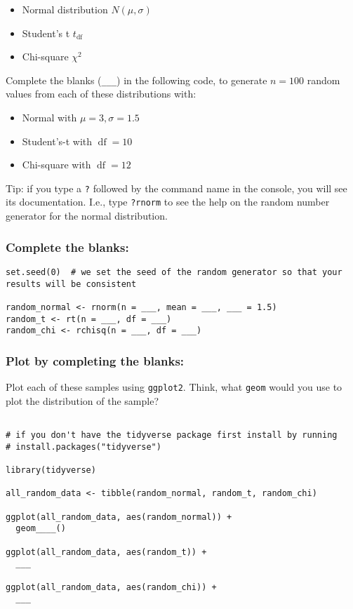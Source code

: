 \documentclass[
]{article}
\providecommand{\tightlist}{%
  \setlength{\itemsep}{0pt}\setlength{\parskip}{0pt}}
\begin{document}
\begin{itemize}
\tightlist
\item
  Normal distribution \(N(\mu, \sigma)\)
\item
  Student's t \(t_{\operatorname{df}}\)
\item
  Chi-square \(\chi^2\)
\end{itemize}

Complete the blanks (\texttt{\_\_\_}) in the following code, to generate
\(n=100\) random values from each of these distributions with:

\begin{itemize}
\tightlist
\item
  Normal with \(\mu=3, \sigma = 1.5\)
\item
  Student's-t with \(\operatorname{df}=10\)
\item
  Chi-square with \(\operatorname{df}=12\)
\end{itemize}

Tip: if you type a \texttt{?} followed by the command name in the
console, you will see its documentation. I.e., type \texttt{?rnorm} to
see the help on the random number generator for the normal distribution.

\hypertarget{complete-the-blanks}{%
\subsubsection{Complete the blanks:}\label{complete-the-blanks}}

\begin{verbatim}
set.seed(0)  # we set the seed of the random generator so that your results will be consistent

random_normal <- rnorm(n = ___, mean = ___, ___ = 1.5)
random_t <- rt(n = ___, df = ___)
random_chi <- rchisq(n = ___, df = ___)
\end{verbatim}

\hypertarget{plot-by-completing-the-blanks}{%
\subsubsection{Plot by completing the
blanks:}\label{plot-by-completing-the-blanks}}

Plot each of these samples using \texttt{ggplot2}. Think, what
\texttt{geom} would you use to plot the distribution of the sample?

\begin{verbatim}

# if you don't have the tidyverse package first install by running
# install.packages("tidyverse")

library(tidyverse) 

all_random_data <- tibble(random_normal, random_t, random_chi)

ggplot(all_random_data, aes(random_normal)) + 
  geom____()

ggplot(all_random_data, aes(random_t)) + 
  ___

ggplot(all_random_data, aes(random_chi)) + 
  ___
\end{verbatim}
\end{document}

